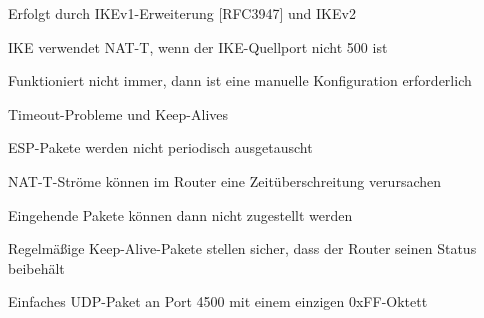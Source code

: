 \documentclass[a4paper]{article}
\begin{document}
\begin{multicols}{3}
\begin{itemize*}
\begin{itemize*}
\begin{itemize*}
                        \item Erfolgt durch IKEv1-Erweiterung {[}RFC3947{]} und IKEv2
                        \item IKE verwendet NAT-T, wenn der IKE-Quellport nicht 500 ist
                        \item Funktioniert nicht immer, dann ist eine manuelle Konfiguration erforderlich
                  \end{itemize*}
                  \item       Timeout-Probleme und Keep-Alives
                  \begin{itemize*}
                        \item ESP-Pakete werden nicht periodisch ausgetauscht
                        \item NAT-T-Ströme können im Router eine Zeitüberschreitung verursachen
                        \item Eingehende Pakete können dann nicht zugestellt werden
                        \item Regelmäßige Keep-Alive-Pakete stellen sicher, dass der Router seinen Status beibehält
                        \item Einfaches UDP-Paket an Port 4500 mit einem einzigen 0xFF-Oktett
                  \end{itemize*}
            \end{itemize*}


\end{itemize*}
\end{multicols}
\end{document}

